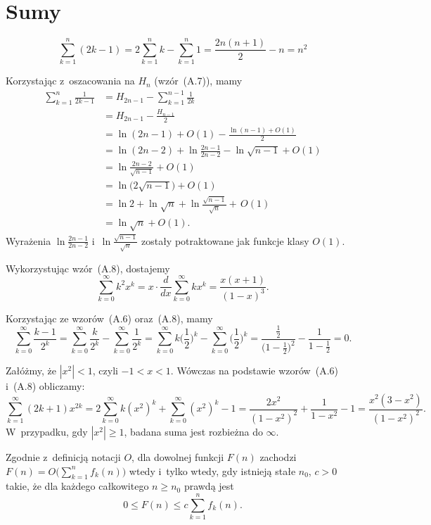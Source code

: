 \chapter{Sumy}


\exercise %
\[
	\sum_{k=1}^n(2k-1) = 2\sum_{k=1}^nk-\sum_{k=1}^n1 = \frac{2n(n+1)}{2}-n = n^2
\]

\exercise %
Korzystając z~oszacowania na $H_n$ (wzór~(A.7)), mamy
\begin{align*}
	\sum_{k=1}^n\frac{1}{2k-1} &= H_{2n-1}-\sum_{k=1}^{n-1}\frac{1}{2k} \\
	&= H_{2n-1}-\frac{H_{n-1}}{2} \\
	&= \ln(2n-1)+O(1)-\frac{\ln(n-1)+O(1)}{2} \\
	&= \ln(2n-2)+\ln\frac{2n-1}{2n-2}-\ln\sqrt{n-1}+O(1) \\
	&= \ln\frac{2n-2}{\sqrt{n-1}}+O(1) \\[1mm]
	&= \ln\bigl(2\sqrt{n-1}\bigr)+O(1) \\
	&= \ln2+\ln\sqrt{n}+\ln\frac{\sqrt{n-1}}{\sqrt{n}}+\,O(1) \\
	&= \ln\sqrt{n}+O(1).
\end{align*}
Wyrażenia $\ln\frac{2n-1}{2n-2}$ i~$\ln\frac{\sqrt{n-1}}{\sqrt{n}}$ zostały potraktowane jak funkcje klasy $O(1)$.

\exercise %
Wykorzystując wzór~(A.8), dostajemy
\[
	\sum_{k=0}^\infty k^2x^k = x\cdot\frac{d}{dx}\sum_{k=0}^\infty kx^k = \frac{x(x+1)}{(1-x)^3}.
\]

\exercise %
Korzystając ze wzorów~(A.6) oraz~(A.8), mamy
\[
	\sum_{k=0}^\infty\frac{k-1}{2^k} = \sum_{k=0}^\infty\frac{k}{2^k}-\sum_{k=0}^\infty\frac{1}{2^k} = \sum_{k=0}^\infty k\biggl(\frac{1}{2}\biggr)^k-\sum_{k=0}^\infty\biggl(\frac{1}{2}\biggr)^k = \frac{\frac{1}{2}}{\bigl(1-\frac{1}{2}\bigr)^2}-\frac{1}{1-\frac{1}{2}} = 0.
\]

\exercise %
Załóżmy, że $|x^2|<1$, czyli $-1<x<1$. Wówczas na podstawie wzorów~(A.6) i~(A.8) obliczamy:
\[
	\sum_{k=1}^\infty(2k+1)x^{2k} = 2\sum_{k=0}^\infty k(x^2)^k+\sum_{k=0}^\infty(x^2)^k-1 = \frac{2x^2}{(1-x^2)^2}+\frac{1}{1-x^2}-1 = \frac{x^2(3-x^2)}{(1-x^2)^2}.
\]
W~przypadku, gdy $|x^2|\ge1$, badana suma jest rozbieżna do $\infty$.

\exercise %
Zgodnie z~definicją notacji $O$, dla dowolnej funkcji $F(n)$ zachodzi $F(n)=O\bigl(\sum_{k=1}^nf_k(n)\bigr)$ wtedy i~tylko wtedy, gdy istnieją stałe $n_0$, $c>0$ takie, że dla każdego całkowitego $n\ge n_0$ prawdą jest
\[
	0 \le F(n) \le c\sum_{k=1}^n f_k(n).
\]

